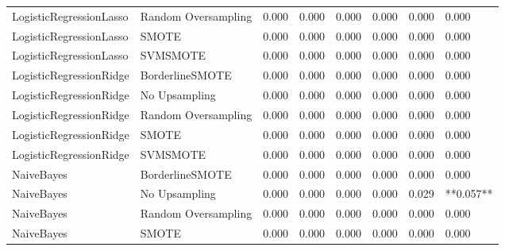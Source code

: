 \begin{tabular}{llllllll}
     LogisticRegressionLasso & Random Oversampling & 0.000 &                     0.000 &                 0.000 &                  0.000 &                                   0.000 &     0.000 \\
     LogisticRegressionLasso &               SMOTE & 0.000 &                     0.000 &                 0.000 &                  0.000 &                                   0.000 &     0.000 \\
     LogisticRegressionLasso &            SVMSMOTE & 0.000 &                     0.000 &                 0.000 &                  0.000 &                                   0.000 &     0.000 \\
     LogisticRegressionRidge &     BorderlineSMOTE & 0.000 &                     0.000 &                 0.000 &                  0.000 &                                   0.000 &     0.000 \\
     LogisticRegressionRidge &       No Upsampling & 0.000 &                     0.000 &                 0.000 &                  0.000 &                                   0.000 &     0.000 \\
     LogisticRegressionRidge & Random Oversampling & 0.000 &                     0.000 &                 0.000 &                  0.000 &                                   0.000 &     0.000 \\
     LogisticRegressionRidge &               SMOTE & 0.000 &                     0.000 &                 0.000 &                  0.000 &                                   0.000 &     0.000 \\
     LogisticRegressionRidge &            SVMSMOTE & 0.000 &                     0.000 &                 0.000 &                  0.000 &                                   0.000 &     0.000 \\
                  NaiveBayes &     BorderlineSMOTE & 0.000 &                     0.000 &                 0.000 &                  0.000 &                                   0.000 &     0.000 \\
                  NaiveBayes &       No Upsampling & 0.000 &                     0.000 &                 0.000 &                  0.000 &                                   0.029 & **0.057** \\
                  NaiveBayes & Random Oversampling & 0.000 &                     0.000 &                 0.000 &                  0.000 &                                   0.000 &     0.000 \\
                  NaiveBayes &               SMOTE & 0.000 &                     0.000 &                 0.000 &                  0.000 &                                   0.000 &     0.000 \\

\end{tabular}
